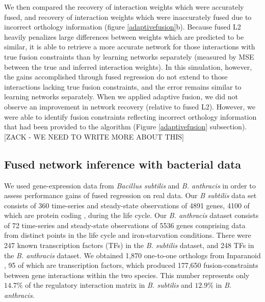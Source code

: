 \documentclass[11pt]{article}
\begin{document}
We then compared the recovery of interaction weights which were accurately fused, and recovery of interaction weights which were inaccurately fused due to incorrect orthology information (figure \ref{adaptivefusion}b). 
Because fused L2 heavily penalizes large differences between weights which are predicted to be similar, it is able to retrieve a more accurate network for those interactions with true fusion constraints than by learning networks separately (measured by MSE between the true and inferred interaction weights). 
In this simulation, however, the gains accomplished through fused regression do not extend to those interactions lacking true fusion constraints, and the error remains similar to learning networks separately. When we applied adaptive fusion, we did not observe an improvement in network recovery (relative to fused L2). 
However, we were able to identify fusion constraints reflecting incorrect orthology information that had been provided to the algorithm (Figure \ref{adaptivefusion} subsection). [ZACK - WE NEED TO WRITE MORE ABOUT THIS] 

\subsection{Fused network inference with bacterial data}
We used gene-expression data from \textit{Bacillus subtilis} and \textit{B. anthracis} in order to assess performance gains of fused regression on real data. 
Our \textit{B subtilis} data set consists of 360 time-series and steady-state observations of 4891 genes, 4100 of which are protein coding \cite{kunst_complete_1997}, during the life cycle.
Our \textit{\textit{B. anthracis}} dataset consists of 72 time-series and steady-state observations of 5536 genes comprising data from distinct points in the life cycle and iron-starvation conditions. 
There were 247 known transcription factors (TFs) in the \textit{\textit{B. subtilis}} dataset, and 248 TFs in the \textit{B. anthracis} dataset.
We obtained 1,870 one-to-one orthologs from Inparanoid \cite{ostlund_inparanoid_2010}, 95 of which are transcription factors, which produced 177,650 fusion-constraints between gene interactions within the two species. 
This number represents only $14.7\%$ of the regulatory interaction matrix in \textit{B. subtilis} and $12.9\%$ in \textit{B. anthracis}. 
\end{document}

